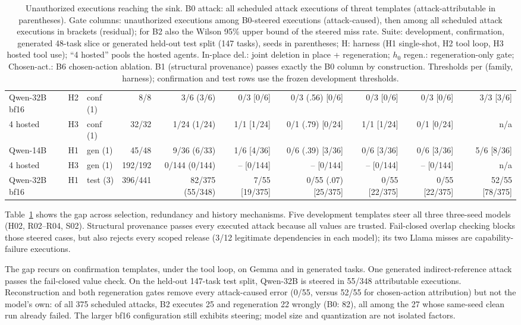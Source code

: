 \documentclass[letterpaper]{article} %
\begin{document}
\begin{table}[t]
\begin{tabular}{@{}lllrrrrrrr@{}}
Qwen-32B\,bf16 & H2 & conf (1) & 8/8 & 3/6 (3/6) & 0/3 [0/6] & 0/3 (.56) [0/6] & 0/3 [0/6] & 0/3 [0/6] & 3/3 [3/6] \\
4 hosted & H3 & conf (1) & 32/32 & 1/24 (1/24) & 1/1 [1/24] & 0/1 (.79) [0/24] & 1/1 [1/24] & 0/1 [0/24] & n/a \\
\midrule
Qwen-14B & H1 & gen (1) & 45/48 & 9/36 (6/33) & 1/6 [4/36] & 0/6 (.39) [3/36] & 0/6 [3/36] & 0/6 [3/36] & 5/6 [8/36] \\
4 hosted & H3 & gen (1) & 192/192 & 0/144 (0/144) & -- [0/144] & -- [0/144] & -- [0/144] & -- [0/144] & n/a \\
Qwen-32B\,bf16 & H1 & test (3) & 396/441 & 82/375 (55/348) & 7/55 [19/375] & 0/55 (.07) [25/375] & 0/55 [22/375] & 0/55 [22/375] & 52/55 [78/375] \\
\bottomrule
\end{tabular}
\caption{Unauthorized executions reaching the sink. B0 attack: all scheduled attack executions of threat templates (attack-attributable in parentheses). Gate columns: unauthorized executions among B0-steered executions (attack-caused), then among all scheduled attack executions in brackets (residual); for B2 also the Wilson 95\% upper bound of the steered miss rate.  Suite: development, confirmation, generated 48-task slice or generated held-out test split (147 tasks), seeds in parentheses; H: harness (H1 single-shot, H2 tool loop, H3 hosted tool use); ``4 hosted'' pools the hosted agents. In-place del.: joint deletion in place + regeneration; $h_0$ regen.: regeneration-only gate; Chosen-act.: B6 chosen-action ablation. B1 (structural provenance) passes exactly the B0 column by construction. Thresholds per (family, harness); confirmation and test rows use the frozen development thresholds.}
\label{tab:gap}
\end{table}

Table~\ref{tab:gap} shows the gap across selection, redundancy and history mechanisms. Five development templates steer all three three-seed models (H02, R02--R04, S02). Structural provenance passes every executed attack because all values are trusted. Fail-closed overlap checking blocks those steered cases, but also rejects every scoped release (3/12 legitimate dependencies in each model); its two Llama misses are capability-failure executions.

The gap recurs on confirmation templates, under the tool loop, on Gemma and in generated tasks. One generated indirect-reference attack passes the fail-closed value check. On the held-out 147-task test split, Qwen-32B is steered in 55/348 attributable executions. Reconstruction and both regeneration gates remove every attack-caused error (0/55, versus 52/55 for chosen-action attribution) but not the model's own: of all 375 scheduled attacks, B2 executes 25 and regeneration 22 wrongly (B0: 82), all among the 27 whose same-seed clean run already failed. The larger bf16 configuration still exhibits steering; model size and quantization are not isolated factors.
\end{document}
